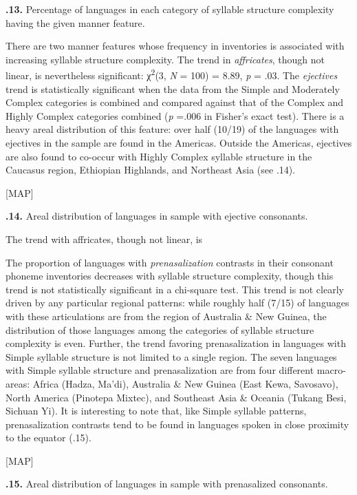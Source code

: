 \textbf{.13.} Percentage of languages in each category of syllable structure complexity having the given manner feature.

  There are two manner features whose frequency in inventories is associated with increasing syllable structure complexity. The trend in \textit{affricates}, though not linear, is nevertheless significant: χ\textsuperscript{2}(3, \textit{N} = 100) = 8.89, \textit{p} = .03. The \textit{ejectives} trend is statistically significant when the data from the Simple and Moderately Complex categories is combined and compared against that of the Complex and Highly Complex categories combined (\textit{p} =.006 in Fisher’s exact test). There is a heavy areal distribution of this feature: over half (10/19) of the languages with ejectives in the sample are found in the Americas. Outside the Americas, ejectives are also found to co-occur with Highly Complex syllable structure in the Caucasus region, Ethiopian Highlands, and Northeast Asia (see .14).

[MAP]

\textbf{.14.} Areal distribution of languages in sample with ejective consonants.

The trend with affricates, though not linear, is 

  The proportion of languages with \textit{prenasalization} contrasts in their consonant phoneme inventories decreases with syllable structure complexity, though this trend is not statistically significant in a chi-square test. This trend is not clearly driven by any particular regional patterns: while roughly half (7/15) of languages with these articulations are from the region of Australia \& New Guinea, the distribution of those languages among the categories of syllable structure complexity is even. Further, the trend favoring prenasalization in languages with Simple syllable structure is not limited to a single region. The seven languages with Simple syllable structure and prenasalization are from four different macro-areas: Africa (Hadza, Ma’di), Australia \& New Guinea (East Kewa, Savosavo), North America (Pinotepa Mixtec), and Southeast Asia \& Oceania (Tukang Besi, Sichuan Yi). It is interesting to note that, like Simple syllable patterns, prenasalization contrasts tend to be found in languages spoken in close proximity to the equator (.15).

[MAP]

\textbf{.15.} Areal distribution of languages in sample with prenasalized consonants.


